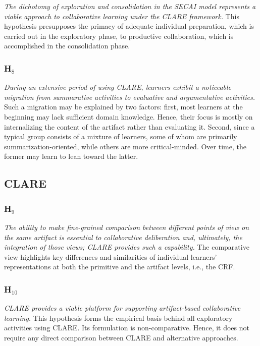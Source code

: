 {\it The dichotomy of exploration and consolidation in the SECAI model
represents a viable approach to collaborative learning under the CLARE
framework.} This hypothesis presupposes the primacy of adequate individual
preparation, which is carried out in the exploratory phase, to productive
collaboration, which is accomplished in the consolidation phase.


\subsubsection{H\(_8\)}
\label{sec:SM2}

{\it During an extensive period of using CLARE, learners exhibit a
noticeable migration from summarative activities to evaluative and
argumentative activities.} Such a migration may be explained by two
factors: first, most learners at the beginning may lack sufficient domain
knowledge.  Hence, their focus is mostly on internalizing the content of
the artifact rather than evaluating it. Second, since a typical group
consists of a mixture of learners, some of whom are primarily
summarization-oriented, while others are more critical-minded.  Over time,
the former may learn to lean toward the latter.


\subsection{CLARE}
\label{sec:clare hypothesis}

\subsubsection{H\(_9\)}
\label{sec:CLARE1}

{\it The ability to make fine-grained comparison between different points
of view on the same artifact is essential to collaborative deliberation
and, ultimately, the integration of those views; CLARE provides such a
capability.} The comparative view highlights key differences and
similarities of individual learners' representations at both the primitive
and the artifact levels, i.e., the CRF.


\subsubsection{H\(_{10}\)}
\label{sec:CLARE2}

{\it CLARE provides a viable platform for supporting artifact-based
collaborative learning.} This hypothesis forms the empirical basis behind
all exploratory activities using CLARE. Its formulation is non-comparative.
Hence, it does not require any direct comparison between CLARE and
alternative approaches.

